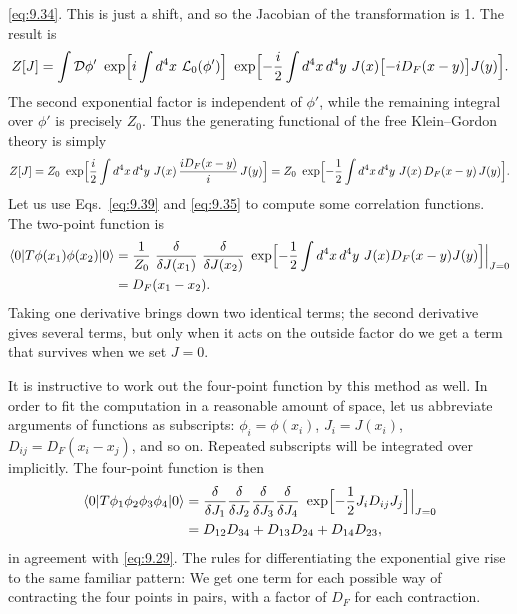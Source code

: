 \eqref{eq:9.34}.  This is just a shift, and so the Jacobian of the
transformation is 1.  The result is
\begin{equation}
  Z[J] = \int \mathcal{D}\phi'\ \exp\Bigl[ i\int d^4x\ \mathcal{L}_0(\phi')
    \Bigr]\ \exp\Bigl[ -\frac{i}{2}\int d^4x\,d^4y\ J(x)
      \bigl[ -iD_F(x-y) \bigr]J(y) \Bigr] .
\end{equation}
The second exponential factor is independent of $\phi'$, while the remaining
integral over $\phi'$ is precisely $Z_0$.  Thus the generating functional of
the free Klein--Gordon theory is simply
\begin{equation}
  Z[J] = Z_0\ \exp\Bigl[ \frac{i}{2}\int d^4x\,d^4y\ J(x)\,
    \frac{iD_F(x-y)}{i}\,J(y) \Bigr]
  = Z_0\ \exp\Bigl[ -\frac{1}{2}\int d^4x\,d^4y\ J(x)\,D_F(x-y)\,J(y)
    \Bigr].
  \label{eq:9.39}
\end{equation}
Let us use Eqs.~\eqref{eq:9.39} and \eqref{eq:9.35} to compute some
correlation functions.  The two-point function is
\begin{equation}
  \begin{aligned}
    \langle 0|T\phi(x_1)\phi(x_2)|0\rangle
    &= \frac{1}{Z_0}\ \frac{\delta}{\delta J(x_1)}\ \frac{\delta}
      {\delta J(x_2)}\ \exp\Bigl[ -\frac{1}{2}\int d^4x\,d^4y\
        J(x)D_F(x-y)J(y) \Bigr]\Big|_{J=0}\\
    &= D_F(x_1-x_2) .
  \end{aligned}
  \label{eq:9.40}
\end{equation}
Taking one derivative brings down two identical terms; the second derivative
gives several terms, but only when it acts on the outside factor do we get a
term that survives when we set $J=0$.

It is instructive to work out the four-point function by this method as well.
In order to fit the computation in a reasonable amount of space, let us
abbreviate arguments of functions as subscripts: $\phi_i = \phi(x_i)$,
$J_i = J(x_i)$, $D_{ij} = D_F(x_i-x_j)$, and so on.  Repeated subscripts will
be integrated over implicitly.  The four-point function is then
\begin{equation}
  \begin{aligned}
    \langle 0|T\phi_1\phi_2\phi_3\phi_4|0\rangle
    &= \frac{\delta}{\delta J_1}\frac{\delta}{\delta J_2}
      \frac{\delta}{\delta J_3}\frac{\delta}{\delta J_4}\
      \exp\Bigl[ -\frac{1}{2}J_iD_{ij}J_j \Bigr]\Big|_{J=0}\\
    &= D_{12}D_{34} + D_{13}D_{24} + D_{14}D_{23} ,
  \end{aligned}
  \label{eq:9.41}
\end{equation}
in agreement with \eqref{eq:9.29}.  The rules for differentiating the
exponential give rise to the same familiar pattern: We get one term for each
possible way of contracting the four points in pairs, with a factor of $D_F$
for each contraction.

